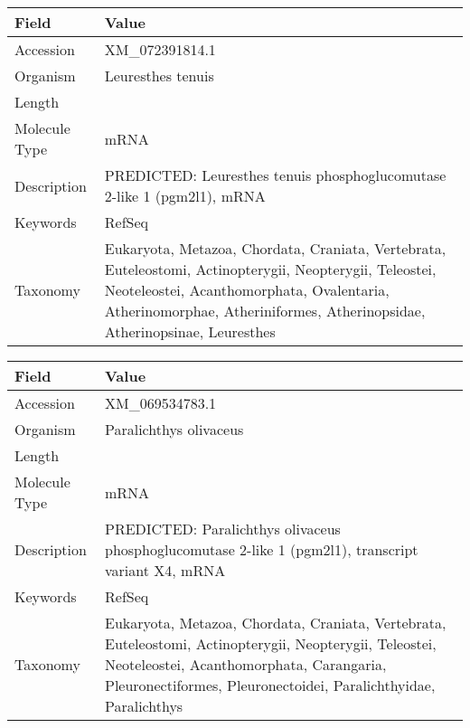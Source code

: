 \documentclass[10pt]{article}
\begin{document}
\vspace{1em}
{\footnotesize
\begin{longtable}{>{\raggedright\arraybackslash}p{4.5cm} >{\raggedright\arraybackslash}p{11.5cm}}
\textbf{Field} & \textbf{Value} \\
\hline
Accession & XM\_072391814.1 \\
Organism & Leuresthes tenuis \\
Length & 3585 \\
Molecule Type & mRNA \\
Description & PREDICTED: Leuresthes tenuis phosphoglucomutase 2-like 1 (pgm2l1), mRNA \\
Keywords & RefSeq \\
Taxonomy & Eukaryota, Metazoa, Chordata, Craniata, Vertebrata, Euteleostomi, Actinopterygii, Neopterygii, Teleostei, Neoteleostei, Acanthomorphata, Ovalentaria, Atherinomorphae, Atheriniformes, Atherinopsidae, Atherinopsinae, Leuresthes \\
\end{longtable}
}

\vspace{1em}
{\footnotesize
\begin{longtable}{>{\raggedright\arraybackslash}p{4.5cm} >{\raggedright\arraybackslash}p{11.5cm}}
\textbf{Field} & \textbf{Value} \\
\hline
Accession & XM\_069534783.1 \\
Organism & Paralichthys olivaceus \\
Length & 3057 \\
Molecule Type & mRNA \\
Description & PREDICTED: Paralichthys olivaceus phosphoglucomutase 2-like 1 (pgm2l1), transcript variant X4, mRNA \\
Keywords & RefSeq \\
Taxonomy & Eukaryota, Metazoa, Chordata, Craniata, Vertebrata, Euteleostomi, Actinopterygii, Neopterygii, Teleostei, Neoteleostei, Acanthomorphata, Carangaria, Pleuronectiformes, Pleuronectoidei, Paralichthyidae, Paralichthys \\
\end{longtable}
}
\end{document}
